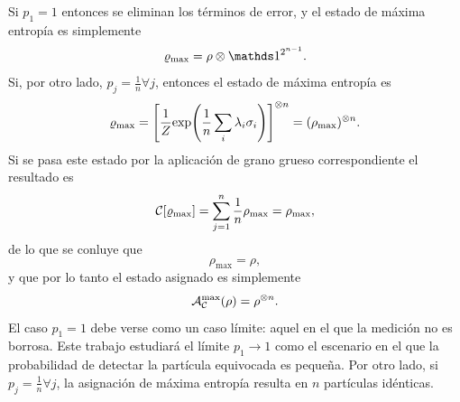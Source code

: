 Si $p_{1}=1$ entonces se eliminan los términos de error, y el estado de máxima entropía es simplemente
\begin{equation*}
    \varrho_{\max}=\rho\otimes\Id^{2^{n-1}}.
\end{equation*}
Si, por otro lado, $p_{j}=\frac{1}{n}\forall j$, entonces el estado de máxima entropía es
\begin{equation*}
    \varrho_{\max}=\qty[\frac{1}{Z}\text{exp}\qty(\frac{1}{n}\sum_{i}\lambda_{i}\sigma_{i})]^{\otimes n}=(\rho_{\max})^{\otimes n}.
\end{equation*}
Si se pasa este estado por la aplicación de grano grueso correspondiente el resultado es 
\begin{equation*}
    \mathcal{C}[\varrho_{\max}]=\sum_{j=1}^{n}\frac{1}{n}\rho_{\max}=\rho_{\max},
\end{equation*}
de  lo que se conluye que
\begin{equation*}
    \rho_{\max}=\rho,
\end{equation*}
y que por lo tanto el estado asignado es simplemente
\begin{equation*}
    \mathcal{A}_{\mathcal{C}}^{\max}(\rho)=\rho^{\otimes n}.
\end{equation*}
El caso $p_{1}=1$ debe verse como un caso límite: aquel en el que la medición no es borrosa. Este trabajo estudiará el límite $p_{1}\rightarrow 1$ como el escenario en el que la probabilidad de detectar la partícula equivocada es pequeña. Por otro lado, si $p_{j}=\frac{1}{n}\forall j$, la asignación de máxima entropía resulta en $n$ partículas idénticas.